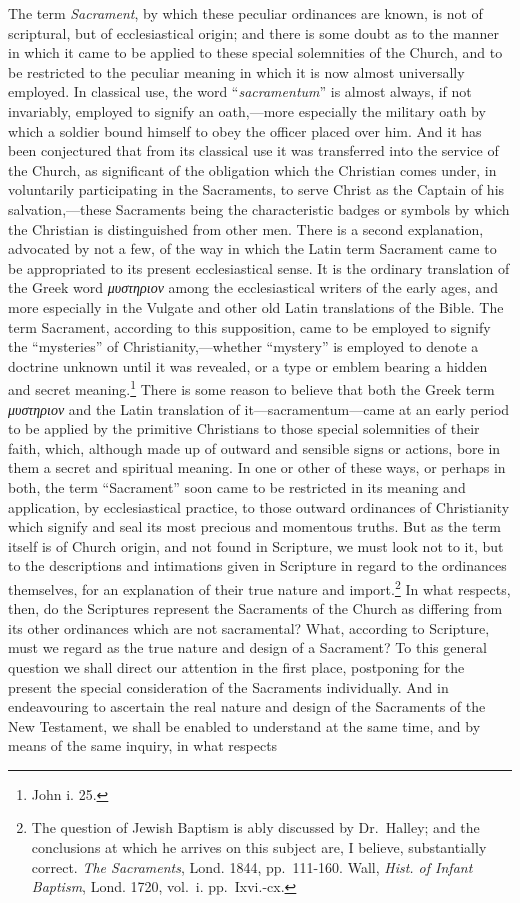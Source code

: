 \documentclass[]{book}
\begin{document}
The term \emph{Sacrament}, by which these peculiar ordinances are known, is not of scriptural, but of ecclesiastical origin; and there is some doubt as to the manner in which it came to be applied to these special solemnities of the Church, and to be restricted to the peculiar meaning in which it is now almost universally employed. In classical use, the word ``\emph{sacramentum}'' is almost always, if not invariably, employed to signify an oath,---more especially the military oath by which a soldier bound himself to obey the officer placed over him. And it has been conjectured that from its classical use it was transferred into the service of the Church, as significant of the obligation which the Christian comes under, in voluntarily participating in the Sacraments, to serve Christ as the Captain of his salvation,---these Sacraments being the characteristic badges or symbols by which the Christian is distinguished from other men. There is a second explanation, advocated by not a few, of the way in which the Latin term Sacrament came to be appropriated to its present ecclesiastical sense. It is the ordinary translation of the Greek word \emph{μυστηριον} among the ecclesiastical writers of the early ages, and more especially in the Vulgate and other old Latin translations of the Bible. The term Sacrament, according to this supposition, came to be employed to signify the ``mysteries'' of Christianity,---whether ``mystery'' is employed to denote a doctrine unknown until it was revealed, or a type or emblem bearing a hidden and secret meaning.\footnote{John i. 25.} There is some reason to believe that both the Greek term \emph{μυστηριον} and the Latin translation of it---sacramentum---came at an early period to be applied by the primitive Christians to those special solemnities of their faith, which, although made up of outward and sensible signs or actions, bore in them a secret and spiritual meaning. In one or other of these ways, or perhaps in both, the term ``Sacrament'' soon came to be restricted in its meaning and application, by ecclesiastical practice, to those outward ordinances of Christianity which signify and seal its most precious and momentous truths. But as the term itself is of Church origin, and not found in Scripture, we must look not to it, but to the descriptions and intimations given in Scripture in regard to the ordinances themselves, for an explanation of their true nature and import.\footnote{The question of Jewish Baptism is ably discussed by Dr.~Halley; and the conclusions at which he arrives on this subject are, I believe, substantially correct. \emph{The Sacraments}, Lond. 1844, pp.~111-160. Wall, \emph{Hist. of Infant Baptism}, Lond. 1720, vol.~i. pp.~Ixvi.-cx.} In what respects, then, do the Scriptures represent the Sacraments of the Church as differing from its other ordinances which are not sacramental? What, according to Scripture, must we regard as the true nature and design of a Sacrament? To this general question we shall direct our attention in the first place, postponing for the present the special consideration of the Sacraments individually. And in endeavouring to ascertain the real nature and design of the Sacraments of the New Testament, we shall be enabled to understand at the same time, and by means of the same inquiry, in what respects 
\end{document}
